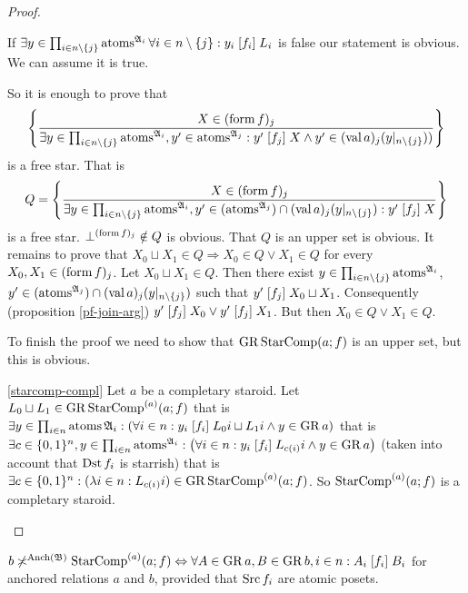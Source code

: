 \begin{proof}
\begin{widedisorder}
If $\exists y\in\prod_{i\in n\setminus\{j\}}\operatorname{atoms}^{\mathfrak{A}_{i}}\forall i\in n\setminus\{j\}:y_{i}\mathrel{\left[f_{i}\right]}L_{i}$
is false our statement is obvious. We can assume it is true.


So it is enough to prove that
\[
\left\{ \frac{X\in(\operatorname{form} f)_{j}}{\exists y\in\prod_{i\in n\setminus\{j\}}\operatorname{atoms}^{\mathfrak{A}_{i}},y'\in\operatorname{atoms}^{\mathfrak{A}_{j}}:y'\mathrel{\left[f_{j}\right]}X\land y'\in(\operatorname{val} a)_{j}(y|_{n\setminus\{j\}}))}\right\}
\]
is a free star. That is
\[
Q=\left\{ \frac{X\in(\operatorname{form} f)_{j}}{\exists y\in\prod_{i\in n\setminus\{j\}}\operatorname{atoms}^{\mathfrak{A}_{i}},y'\in(\operatorname{atoms}^{\mathfrak{A}_{j}})\cap(\operatorname{val} a)_{j}(y|_{n\setminus\{j\}}):y'\mathrel{\left[f_{j}\right]}X}\right\}
\]
is a free star. $\bot^{(\operatorname{form} f)_{j}}\notin Q$ is obvious. That $Q$
is an upper set is obvious. It remains to prove that $X_{0}\sqcup X_{1}\in Q\Rightarrow X_{0}\in Q\vee X_{1}\in Q$
for every $X_{0},X_{1}\in(\operatorname{form} f)_{j}$. Let $X_{0}\sqcup X_{1}\in Q$.
Then there exist $y\in\prod_{i\in n\setminus\{j\}}\operatorname{atoms}^{\mathfrak{A}_{i}}$,
$y'\in(\operatorname{atoms}^{\mathfrak{A}_{j}})\cap(\operatorname{val} a)_{j}(y|_{n\setminus\{j\}})$
such that $y'\mathrel{\left[f_{j}\right]}X_{0}\sqcup X_{1}$. Consequently (proposition
\ref{pf-join-arg}) $y'\mathrel{\left[f_{j}\right]}X_{0}\vee y'\mathrel{\left[f_{j}\right]}X_1$.
But then $X_{0}\in Q\vee X_{1}\in Q$.


To finish the proof we need to show that $\operatorname{GR}\operatorname{StarComp}(a;f)$ is an
upper set, but this is obvious.

\item [{\ref{starcomp-compl}}] Let $a$ be a completary staroid. Let $L_{0}\sqcup L_{1}\in\operatorname{GR}\operatorname{StarComp}^{(a)}(a;f)$
that is $\exists y\in\prod_{i\in n}\operatorname{atoms}\mathfrak{A}_{i}:\left(\forall i\in n:y_{i}\mathrel{\left[f_{i}\right]}L_{0}i\sqcup L_{1}i\wedge y\in\operatorname{GR} a\right)$
that is $\exists c\in\{0,1\}^{n},y\in\prod_{i\in n}\operatorname{atoms}^{\mathfrak{A}_{i}}:\left(\forall i\in n:y_{i}\mathrel{\left[f_{i}\right]}L_{c(i)}i\wedge y\in\operatorname{GR} a\right)$
(taken into account that $\operatorname{Dst} f_{i}$ is starrish) that is $\exists c\in\{0,1\}^{n}:(\lambda i\in n:L_{c(i_{})}i)\in\operatorname{GR}\operatorname{StarComp}^{(a)}(a;f)$.
So $\operatorname{StarComp}^{(a)}(a;f)$ is a completary staroid.
\end{widedisorder}
\end{proof}
\begin{lem}
$b\not\asymp^{\operatorname{Anch}(\mathfrak{B})}\operatorname{StarComp}^{(a)}(a;f)\Leftrightarrow\forall A\in\operatorname{GR} a,B\in\operatorname{GR} b,i\in n:A_{i}\mathrel{\left[f_{i}\right]}B_{i}$
for anchored relations $a$ and $b$, provided that $\operatorname{Src} f_{i}$
are atomic posets.\end{lem}
